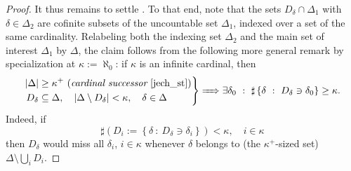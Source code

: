\documentclass[11pt,leqno]{article}
\theoremstyle{plain}
\theoremstyle{plain}
\theoremstyle{plain}
\numberwithin{equation}{section}
\theoremstyle{nonumberplain}
\newtheorem{proof}{Proof}
\newcommand\1{{\bf 1}}
\begin{document}
\begin{proof}
  It thus remains to settle . To that end, note that the sets $D_{\delta}\cap \Delta_1$ with $\delta\in \Delta_2$ are cofinite subsets of the uncountable set $\Delta_1$, indexed over a set of the same cardinality. Relabeling both the indexing set $\Delta_2$ and the main set of interest $\Delta_1$ by $\Delta$, the claim  follows from the following more general remark by specialization at $\kappa:=\aleph_0$: if $\kappa$ is an infinite cardinal, then
  \begin{equation}\label{eq:many.large.sets}
    \left.
      \begin{aligned}
        |\Delta|
        &\ge \kappa^+\text{  ({\it cardinal successor} \cite[p.29]{jech_st})}\\
        D_{\delta}
        &\subseteq \Delta
          ,\quad
          |\Delta\setminus D_{\delta}|<\kappa
          ,\quad
          \delta\in \Delta
      \end{aligned}
    \right\rbrace
    \xRightarrow{\quad}
    \exists\delta_0
    \ :\
    \sharp\left\{\delta\ :\ D_{\delta}\ni \delta_0\right\}\ge \kappa.
  \end{equation}
  Indeed, if
  \begin{equation*}
    \sharp
    \left(
      D_i:=\left\{\delta\ :\ D_{\delta}\ni \delta_i\right\}
    \right)
    <\kappa    
    ,\quad i\in \kappa
  \end{equation*}
  then $D_{\delta}$ would miss all $\delta_i$, $i\in \kappa$ whenever $\delta$ belongs to (the $\kappa^+$-sized set) $\Delta\setminus\bigcup_i D_i$.
\end{proof}
\end{document}

